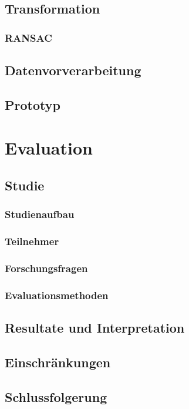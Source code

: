 \documentclass[
  ngerman,
  a4paper,  %
  twoside,  %
  bibliography=totoc,
  headsepline,
  cleardoublepage=empty,
  parskip=half,
  draft=false
]{scrbook}
\begin{document}
\section{Transformation}

\subsection{RANSAC}

\section{Datenvorverarbeitung \label{chp:datenvorbereitung}}
\section{Prototyp}

\chapter{Evaluation \label{chp:evaluation}}
\section{Studie}
\subsection{Studienaufbau}
\subsection{Teilnehmer}
\subsection{Forschungsfragen}
\subsection{Evaluationsmethoden}
\section{Resultate und Interpretation}
\section{Einschränkungen}
\section{Schlussfolgerung}
\end{document}
